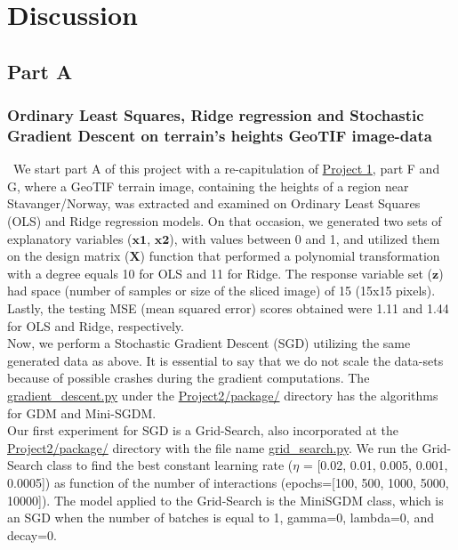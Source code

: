 \section{Discussion}
\label{chap:Discussion}

\subsection{Part A}
\label{chap:PartA}

\subsubsection{Ordinary Least Squares, Ridge regression and Stochastic Gradient Descent on terrain's heights GeoTIF image-data}
\label{chap:Ordinary Least Squares, Ridge regression and Stochastic Gradient Descent on terrain's heights GeoTIF image-data}

\qquad \, We start part A of this project with a re-capitulation of \href{https://github.com/fabiorodp/UiO-FYS-STK4155/blob/master/Project1}{Project 1}, part F and G, where a GeoTIF terrain image, containing the heights of a region near Stavanger/Norway, was extracted and examined on Ordinary Least Squares (OLS) and Ridge regression models. On that occasion, we generated two sets of explanatory variables ($\boldsymbol{x1}$, $\boldsymbol{x2}$), with values between 0 and 1, and utilized them on the design matrix ($\boldsymbol{X}$) function that performed a polynomial transformation with a degree equals 10 for OLS and 11 for Ridge. The response variable set ($\boldsymbol{z}$) had space (number of samples or size of the sliced image) of 15 (15x15 pixels). Lastly, the testing MSE (mean squared error) scores obtained were 1.11 and 1.44 for OLS and Ridge, respectively.\\

Now, we perform a Stochastic Gradient Descent (SGD) utilizing the same generated data as above. It is essential to say that we do not scale the data-sets because of possible crashes during the gradient computations. The \href{https://github.com/fabiorodp/UiO-FYS-STK4155/blob/master/Project2/package/gradient_descent.py}{gradient\_descent.py} under the \href{https://github.com/fabiorodp/UiO-FYS-STK4155/tree/master/Project2/package}{Project2/package/} directory has the algorithms for GDM and Mini-SGDM.\\

Our first experiment for SGD is a Grid-Search, also incorporated at the \href{https://github.com/fabiorodp/UiO-FYS-STK4155/tree/master/Project2/package}{Project2/package/} directory with the file name \href{https://github.com/fabiorodp/UiO-FYS-STK4155/blob/master/Project2/package/grid_search.py}{grid\_search.py}. We run the Grid-Search class to find the best constant learning rate ($\eta$ = [0.02, 0.01, 0.005, 0.001, 0.0005]) as function of the number of interactions (epochs=[100, 500, 1000, 5000, 10000]). The model applied to the Grid-Search is the MiniSGDM class, which is an SGD when the number of batches is equal to 1, gamma=0, lambda=0, and decay=0.\\


